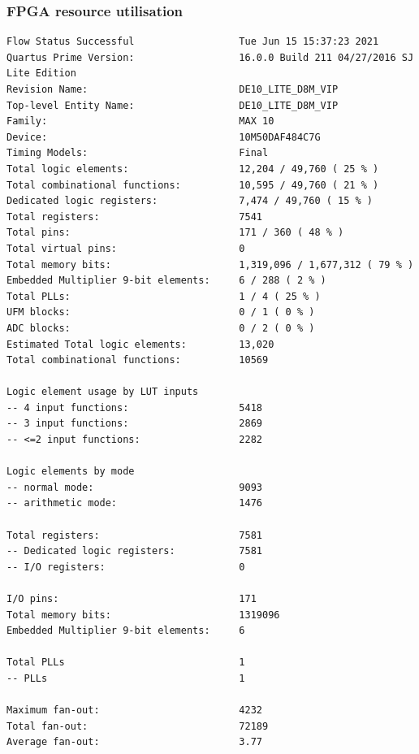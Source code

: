 \documentclass[11pt, a4paper]{article}
\begin{document}
\subsubsection{FPGA resource utilisation}

\begin{verbatim}
Flow Status	Successful                  Tue Jun 15 15:37:23 2021
Quartus Prime Version:                  16.0.0 Build 211 04/27/2016 SJ Lite Edition
Revision Name:                          DE10_LITE_D8M_VIP
Top-level Entity Name:                  DE10_LITE_D8M_VIP
Family:                                 MAX 10
Device:                                 10M50DAF484C7G
Timing Models:                          Final
Total logic elements:                   12,204 / 49,760 ( 25 % )
Total combinational functions:          10,595 / 49,760 ( 21 % )
Dedicated logic registers:              7,474 / 49,760 ( 15 % )
Total registers:                        7541
Total pins:                             171 / 360 ( 48 % )
Total virtual pins:                     0
Total memory bits:                      1,319,096 / 1,677,312 ( 79 % )
Embedded Multiplier 9-bit elements:     6 / 288 ( 2 % )
Total PLLs:                             1 / 4 ( 25 % )
UFM blocks:                             0 / 1 ( 0 % )
ADC blocks:                             0 / 2 ( 0 % )
Estimated Total logic elements:         13,020
Total combinational functions:          10569

Logic element usage by LUT inputs	
-- 4 input functions:                   5418
-- 3 input functions:                   2869
-- <=2 input functions:                 2282

Logic elements by mode	
-- normal mode:                         9093
-- arithmetic mode:                     1476

Total registers:                        7581
-- Dedicated logic registers:           7581
-- I/O registers:                       0

I/O pins:                               171
Total memory bits:                      1319096
Embedded Multiplier 9-bit elements:     6

Total PLLs	                            1
-- PLLs	                                1

Maximum fan-out:                        4232
Total fan-out:                          72189
Average fan-out:                        3.77
\end{verbatim}




\pagebreak
\end{document}
